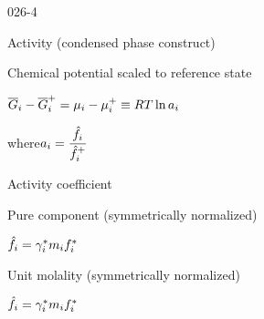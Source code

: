 \begin{mitframe}{026-4}

 	
    \begin{listone}
 
    	\item Activity (condensed phase construct) 
    
    	\begin{listtwo}
        
        	\item Chemical potential scaled to reference state
            
            \item  $\overline{\gibbs}_{\state}-\overline{\gibbs}_{\state}^+=\chempot_{\state}-\chempot_{\state}^+\equiv\gasconst\Temp\ln\activity_{\state}$   
            
            \begin{listthree}
            
            	\item where$\activity_{\state} =\dfrac{\hat{\fug}_{\state}}{\hat{\fug}_{\state}^+}$

			\end{listthree}
            
			\item Activity coefficient
            
            \begin{listthree}

				\item Pure component (symmetrically normalized) 
                
                \begin{listfour}
                
                	\item$\hat{\fug}_{\state}=\actcoeff^*\mass_{\state}\fug_{\state}^*$

				\end{listfour}
                
                \item Unit molality (symmetrically normalized)
                
                \begin{listfour}
                
                	\item   $\hat{\fug}_{\state}=\actcoeff^*\mass_{\state}\fug_{\state}^*$                



\end{listfour}
\end{listthree}
\end{listtwo}
\end{listone}
\end{mitframe}
